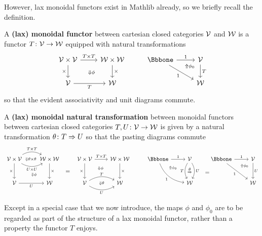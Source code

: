 However, lax monoidal functors exist in Mathlib already, so we briefly recall the definition.

\begin{defn}\label{defn:lax-monoidal} A \textbf{(lax) monoidal functor} between cartesian closed categories ${\mathord{\mathcal{V}}}$ and ${\mathord{\mathcal{W}}}$ is a functor $T \colon {\mathord{\mathcal{V}}} \to {\mathord{\mathcal{W}}}$ equipped with natural transformations
\[
\begin{tikzcd} \cV \times \cV \arrow[r, "T\times T"] \arrow[dr, phantom, "\scriptstyle\Downarrow\phi"] \arrow[d, "\times"'] & \cW \times \cW \arrow[d, "\times"] & \catone \arrow[r, "1"] \arrow[dr, "1"'] & \cV \arrow[d, "T"] \\ \cV \arrow[r, "T"'] & \cW  &\arrow[ur, phantom, "\scriptstyle\Uparrow\phi_0" pos=.85] & \cW
\end{tikzcd}
\]
so that the evident associativity and unit diagrams commute.
\end{defn}

\begin{defn} A \textbf{(lax) monoidal natural transformation} between monoidal functors between cartesian closed categories $T,U \colon {\mathord{\mathcal{V}}} \to {\mathord{\mathcal{W}}}$ is given by a natural transformation $\theta \colon T \Rightarrow U$ so that the pasting diagrams commute
\[
\begin{tikzcd}[row sep=large, column sep=2.3em] \cV \times \cV \arrow[r, "T\times T", bend left] \arrow[r, "U \times U"', bend right] \arrow[r, phantom, "\scriptstyle\Downarrow\theta\times\theta"] \arrow[dr, phantom, "\scriptstyle\Downarrow\phi\quad" pos=.7] \arrow[d, "\times"'] & \cW \times \cW \arrow[d, "\times"] \arrow[dr, phantom, "="] & \cV \times \cV \arrow[r, "T\times T"] \arrow[dr, phantom, "\scriptstyle\quad\Downarrow\phi" pos=.3] \arrow[d, "\times"'] & \cW \times \cW \arrow[d, "\times"] & \catone \arrow[r, "1"] \arrow[dr, bend right, "1"'] & \cV \arrow[d, bend right, "T"'] \arrow[d, bend left, "U"] \arrow[d, phantom, "\scriptstyle\To" pos=.6, "\scriptstyle\theta" pos=.4] \arrow[dr, phantom, "="] &  \catone \arrow[r, "1"] \arrow[dr, "1"'] & \arrow[d, "U"] \cV \\ \cV \arrow[r, "U"']  & \cW &
\cV \arrow[r, "T", bend left] \arrow[r, "U"', bend right] \arrow[r, phantom, "\scriptstyle\Downarrow\theta"] & \cW  &\arrow[ur, phantom, "\scriptstyle\Uparrow\phi_0\quad\quad" pos=.75] & \cW &~\arrow[ur, phantom, "\scriptstyle\Uparrow\phi_0" pos=.85]  & \cW
\end{tikzcd}
\]
\end{defn}

Except in a special case that we now introduce, the maps $\phi$ and $\phi_0$ are to be regarded as part of the structure of a lax monoidal functor, rather than a property the functor $T$ enjoys.

